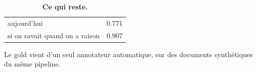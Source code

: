 \documentclass[11pt,a4paper]{article}
\begin{document}
\begin{table}[h]\centering
\caption*{\textbf{Ce qui reste.}}
\begin{tabular}{lc}
\toprule
aujourd'hui                        & 0.771 \\
si on savait quand on a raison     & 0.907 \\
\bottomrule
\end{tabular}
\end{table}

Le gold vient d'un seul annotateur automatique, sur des documents synthétiques
du même pipeline.
\end{document}
